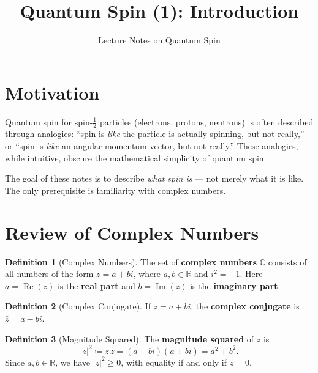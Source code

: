 \documentclass[11pt,a4paper]{article}
\title{\textbf{Quantum Spin (1): Introduction}}
\author{Lecture Notes on Quantum Spin}
\date{}
\theoremstyle{definition}
\newtheorem{definition}{Definition}[section]
\theoremstyle{plain}
\theoremstyle{remark}
\begin{document}
\maketitle
\tableofcontents
\newpage

\section{Motivation}

Quantum spin for spin-$\frac{1}{2}$ particles (electrons, protons, neutrons) is often described through analogies: ``spin is \emph{like} the particle is actually spinning, but not really,'' or ``spin is \emph{like} an angular momentum vector, but not really.'' These analogies, while intuitive, obscure the mathematical simplicity of quantum spin.

The goal of these notes is to describe \emph{what spin is} --- not merely what it is like. The only prerequisite is familiarity with complex numbers.

\section{Review of Complex Numbers}

\begin{definition}[Complex Numbers]
    The set of \textbf{complex numbers} $\mathbb{C}$ consists of all numbers of the form $z = a + bi$, where $a, b \in \mathbb{R}$ and $i^2 = -1$. Here $a = \operatorname{Re}(z)$ is the \textbf{real part} and $b = \operatorname{Im}(z)$ is the \textbf{imaginary part}.
\end{definition}

\begin{definition}[Complex Conjugate]
    If $z = a + bi$, the \textbf{complex conjugate} is $\bar{z} = a - bi$.
\end{definition}

\begin{definition}[Magnitude Squared]
    The \textbf{magnitude squared} of $z$ is
    \[
        |z|^2 \coloneqq \bar{z}\, z = (a - bi)(a + bi) = a^2 + b^2.
    \]
    Since $a, b \in \mathbb{R}$, we have $|z|^2 \geq 0$, with equality if and only if $z = 0$.
\end{definition}
\end{document}
